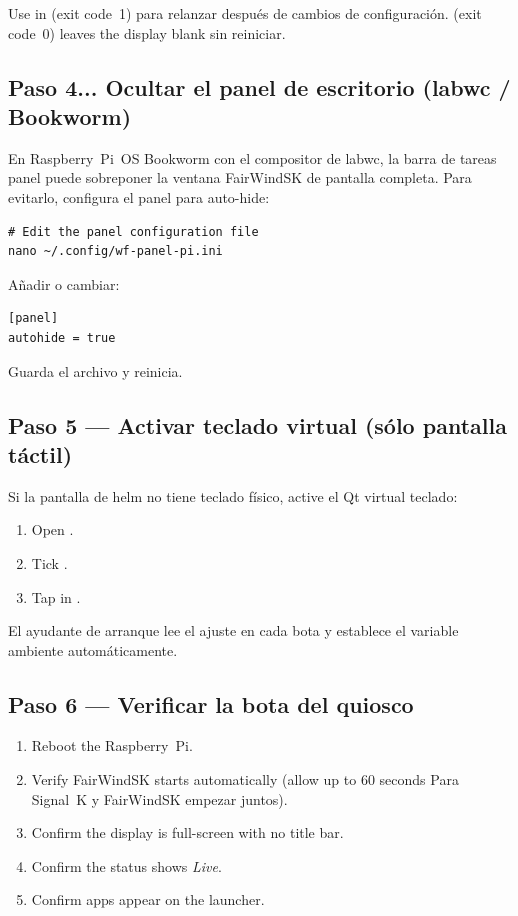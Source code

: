 \begin{warningbox}
Use  in  (exit code~1)
para relanzar después de cambios de configuración.
 (exit code~0) leaves the display blank
sin reiniciar.
\end{warningbox}

\subsection{Paso 4... Ocultar el panel de escritorio (labwc / Bookworm)}

En Raspberry~Pi~OS Bookworm con el compositor de labwc, la barra de tareas
panel puede sobreponer la ventana FairWindSK de pantalla completa.
Para evitarlo, configura el panel para auto-hide:

\begin{lstlisting}
# Edit the panel configuration file
nano ~/.config/wf-panel-pi.ini
\end{lstlisting}

Añadir o cambiar:

\begin{lstlisting}
[panel]
autohide = true
\end{lstlisting}

Guarda el archivo y reinicia.

\subsection{Paso 5 --- Activar teclado virtual (sólo pantalla táctil)}

Si la pantalla de helm no tiene teclado físico, active el Qt virtual
teclado:

\begin{enumerate}
  \item Open .
  \item Tick .
  \item Tap  in .
\end{enumerate}

El ayudante de arranque lee el ajuste en cada bota y establece el
variable ambiente automáticamente.

\subsection{Paso 6 --- Verificar la bota del quiosco}

\begin{enumerate}
  \item Reboot the Raspberry~Pi.
  \item Verify FairWindSK starts automatically (allow up to 60 seconds
Para Signal~K y FairWindSK empezar juntos).
  \item Confirm the display is full-screen with no title bar.
  \item Confirm the status shows \textit{Live}.
  \item Confirm apps appear on the launcher.
\end{enumerate}

